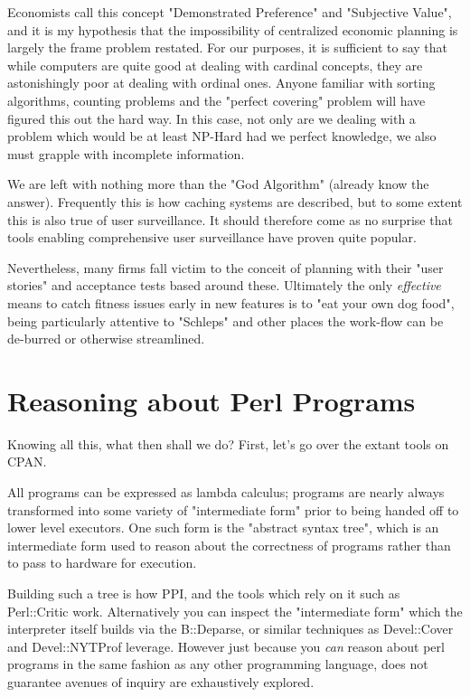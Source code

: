 \documentclass{article}
\begin{document}
Economists call this concept "Demonstrated Preference" and "Subjective Value"\cite{mises1},
and it is my hypothesis that the impossibility of centralized economic planning \cite{mises2} is largely the frame problem restated.
For our purposes, it is sufficient to say that while computers are quite good at dealing with cardinal concepts, they are astonishingly poor at dealing with ordinal ones.
Anyone familiar with sorting algorithms, counting problems and the "perfect covering" problem will have figured this out the hard way.
In this case, not only are we dealing with a problem which would be at least NP-Hard had we perfect knowledge, we also must grapple with incomplete information.

We are left with nothing more than the "God Algorithm" (already know the answer). \cite{atwood}
Frequently this is how caching systems are described, but to some extent this is also true of user surveillance.
It should therefore come as no surprise that tools enabling comprehensive user surveillance have proven quite popular.

Nevertheless, many firms fall victim to the conceit of planning with their "user stories" and acceptance tests based around these.
Ultimately the only \textit{effective} means to catch fitness issues early in new features is to "eat your own dog food",
being particularly attentive to "Schleps" \cite{schlep} and other places the work-flow can be de-burred or otherwise streamlined.

\section{Reasoning about Perl Programs}

Knowing all this, what then shall we do?
First, let's go over the extant tools on CPAN.

All programs can be expressed as lambda calculus; programs are nearly always transformed into some variety of "intermediate form" prior to being handed off to lower level executors.
One such form is the "abstract syntax tree", which is an intermediate form used to reason about the correctness of programs rather than to pass to hardware for execution.

Building such a tree is how PPI, and the tools which rely on it such as Perl::Critic work.
Alternatively you can inspect the "intermediate form" which the interpreter itself builds via the B::Deparse, or similar techniques as Devel::Cover and Devel::NYTProf leverage.
However just because you \textit{can} reason about perl programs in the same fashion as any other programming language, does not guarantee avenues of inquiry are exhaustively explored.
\end{document}
